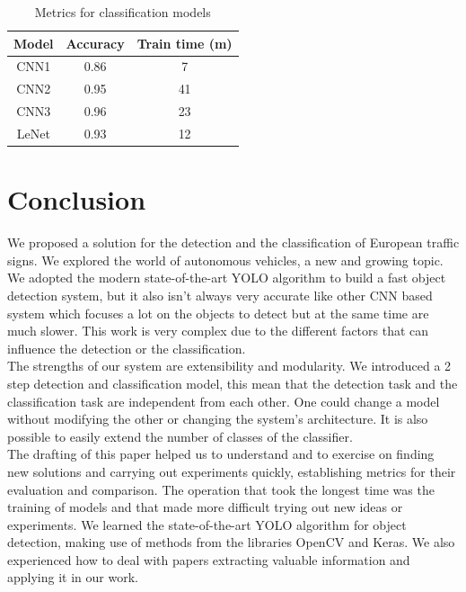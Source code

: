 \documentclass[10pt,twocolumn,letterpaper]{article}
\begin{document}
\begin{table}[h!]
	\begin{center}
		\begin{tabular}{|c|c|c|}
			\hline
			Model & Accuracy & Train time (m) \\
			\hline\hline
			CNN1 & 0.86 & 7 \\
			CNN2 & 0.95 & 41 \\
			CNN3 & 0.96 & 23 \\
			LeNet & 0.93 & 12 \\
			\hline
		\end{tabular}
	\end{center}
	\caption{Metrics for classification models}
	\label{class-metrics}
\end{table}
\section{Conclusion}
We proposed a solution for the detection and the classification of European traffic signs. We explored the world of autonomous vehicles, a new and growing topic. We adopted the modern state-of-the-art YOLO algorithm to build a fast object detection system, but it also isn't always very accurate like other CNN based system which focuses a lot on the objects to detect but at the same time are much slower. This work is very complex due to the different factors that can influence the detection or the classification.\\

\noindent The strengths of our system are extensibility and modularity. We introduced a 2 step detection and classification model, this mean that the detection task and the classification task are independent from each other. One could change a model without modifying the other or changing the system's architecture. It is also possible to easily extend the number of classes of the classifier.\\

\noindent The drafting of this paper helped us to understand and to exercise on finding new solutions and carrying out experiments quickly, establishing metrics for their evaluation and comparison. The operation that took the longest time was the training of models and that made more difficult trying out new ideas or experiments. We learned the state-of-the-art YOLO algorithm for object detection, making use of methods from the libraries OpenCV and Keras. We also experienced how to deal with papers extracting valuable information and applying it in our work.\\
\end{document}
